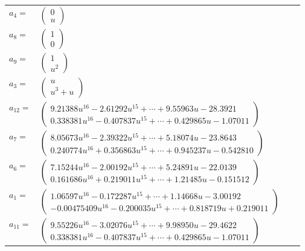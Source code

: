 \documentclass[1p]{elsarticle_modified}
\theoremstyle{definition}
\begin{document}
\begin{tabular}{m{7pt} m{180pt} m{7pt} m{180pt} }
\flushright $a_{4}=$&$\begin{pmatrix}0\\u\end{pmatrix}$ \\
\flushright $a_{8}=$&$\begin{pmatrix}1\\0\end{pmatrix}$ \\
\flushright $a_{9}=$&$\begin{pmatrix}1\\u^2\end{pmatrix}$ \\
\flushright $a_{3}=$&$\begin{pmatrix}u\\u^3+u\end{pmatrix}$ \\
\flushright $a_{12}=$&$\begin{pmatrix}9.21388 u^{16}-2.61292 u^{15}+\cdots+9.55963 u-28.3921\\0.338381 u^{16}-0.407837 u^{15}+\cdots+0.429865 u-1.07011\end{pmatrix}$ \\
\flushright $a_{7}=$&$\begin{pmatrix}8.05673 u^{16}-2.39322 u^{15}+\cdots+5.18074 u-23.8643\\0.240774 u^{16}+0.356863 u^{15}+\cdots+0.945237 u-0.542810\end{pmatrix}$ \\
\flushright $a_{6}=$&$\begin{pmatrix}7.15244 u^{16}-2.00192 u^{15}+\cdots+5.24891 u-22.0139\\0.161686 u^{16}+0.219011 u^{15}+\cdots+1.21485 u-0.151512\end{pmatrix}$ \\
\flushright $a_{1}=$&$\begin{pmatrix}1.06597 u^{16}-0.172287 u^{15}+\cdots+1.14668 u-3.00192\\-0.00475409 u^{16}-0.200035 u^{15}+\cdots+0.818719 u+0.219011\end{pmatrix}$ \\
\flushright $a_{11}=$&$\begin{pmatrix}9.55226 u^{16}-3.02076 u^{15}+\cdots+9.98950 u-29.4622\\0.338381 u^{16}-0.407837 u^{15}+\cdots+0.429865 u-1.07011\end{pmatrix}$ \\

\end{tabular}
\end{document}
